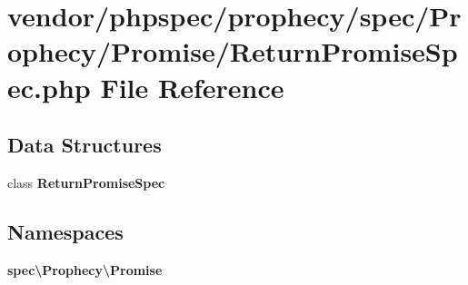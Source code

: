 \section{vendor/phpspec/prophecy/spec/\+Prophecy/\+Promise/\+Return\+Promise\+Spec.php File Reference}
\label{_return_promise_spec_8php}
\subsection*{Data Structures}
\begin{DoxyCompactItemize}
\item 
class {\bf Return\+Promise\+Spec}
\end{DoxyCompactItemize}
\subsection*{Namespaces}
\begin{DoxyCompactItemize}
\item 
 {\bf spec\textbackslash{}\+Prophecy\textbackslash{}\+Promise}
\end{DoxyCompactItemize}
